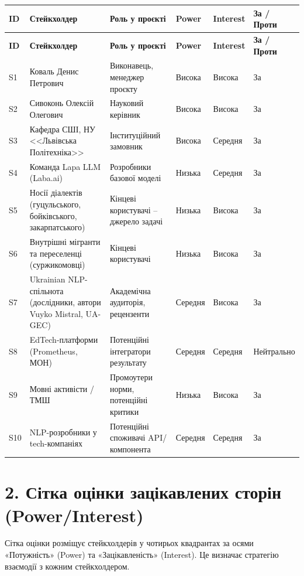 \documentclass[14pt]{extarticle}
\begin{document}
\begin{longtable}{|p{}|p{}|p{}|p{}|p{}|p{}|}
\hline
\textbf{ID} & \textbf{Стейкхолдер} & \textbf{Роль у проєкті} & \textbf{Power} & \textbf{Interest} & \textbf{За / Проти} \\
\hline
\endfirsthead
\hline
\textbf{ID} & \textbf{Стейкхолдер} & \textbf{Роль у проєкті} & \textbf{Power} & \textbf{Interest} & \textbf{За / Проти} \\
\hline
\endhead
S1 & Коваль Денис Петрович & Виконавець, менеджер проєкту & Висока & Висока & За \\
\hline
S2 & Сивоконь Олексій Олегович & Науковий керівник & Висока & Висока & За \\
\hline
S3 & Кафедра СШІ, НУ <<Львівська Політехніка>> & Інституційний замовник & Висока & Середня & За \\
\hline
S4 & Команда Lapa LLM (Laba.ai) & Розробники базової моделі & Низька & Середня & За \\
\hline
S5 & Носії діалектів (гуцульського, бойківського, закарпатського) & Кінцеві користувачі -- джерело задачі & Низька & Висока & За \\
\hline
S6 & Внутрішні мігранти та переселенці (суржикомовці) & Кінцеві користувачі & Низька & Висока & За \\
\hline
S7 & Ukrainian NLP-спільнота (дослідники, автори Vuyko Mistral, UA-GEC) & Академічна аудиторія, рецензенти & Середня & Висока & За \\
\hline
S8 & EdTech-платформи (Prometheus, МОН) & Потенційні інтегратори результату & Середня & Середня & Нейтрально \\
\hline
S9 & Мовні активісти / ТМШ & Промоутери норми, потенційні критики & Низька & Висока & За \\
\hline
S10 & NLP-розробники у tech-компаніях & Потенційні споживачі API/компонента & Середня & Середня & За \\
\hline
\end{longtable}

\section*{2. Сітка оцінки зацікавлених сторін (Power/Interest)}

Сітка оцінки розміщує стейкхолдерів у чотирьох квадрантах за осями «Потужність» (Power) та «Зацікавленість» (Interest). Це визначає стратегію взаємодії з кожним стейкхолдером.
\end{document}
